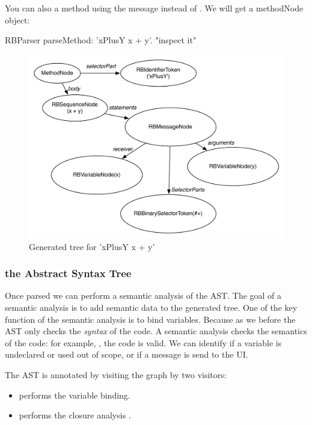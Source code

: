\documentclass[a4paper,10pt,twoside]{book}
\begin{document}
You can also   a method using the message  instead of . We will get a methodNode object:

\begin{code}{}
RBParser parseMethod: 'xPlusY x + y'.
"inspect it"
\end{code}



\begin{figure}[ht]\centering
	\includegraphics[width=0.7\linewidth]{ASTbeforeSemanticAnalysis}
	\caption{Generated tree for  'xPlusY x + y' }
\end{figure}


\subsubsection{ the Abstract Syntax Tree}

Once parsed we can perform a semantic analysis of the AST. The goal of a semantic analysis is to add semantic data to the generated tree. One of the key function of the semantic analysis is to bind variables. 
Because as we  before the AST only checks the \emph{syntax} of the code. A semantic analysis  checks the semantics of the code: for example, , the code is valid. We can identify if a variable is undeclared or used out of scope, or if a message is send to the UI. 

The AST is annotated by visiting the graph by two visitors:
\begin{itemize}
\item {} performs the variable binding.
\item {} performs the closure analysis .
\end{itemize}
\end{document}
